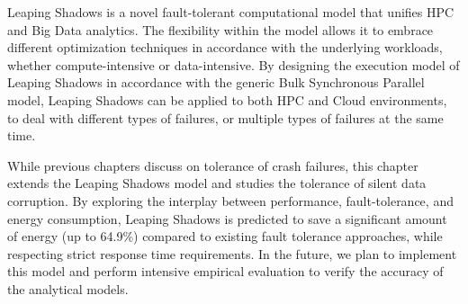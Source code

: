 Leaping Shadows is a novel fault-tolerant computational model that unifies HPC and Big Data analytics. 
The flexibility within the model allows it to embrace different optimization techniques in accordance with the underlying workloads, whether compute-intensive or data-intensive. 
By designing the execution model of Leaping Shadows in accordance with the generic Bulk Synchronous Parallel model, Leaping Shadows can be applied to both HPC and Cloud environments, to deal with different types of failures, or multiple types of failures at the same time. 

While previous chapters discuss on tolerance of crash failures, this chapter extends the Leaping Shadows model and studies the tolerance of silent data corruption. 
By exploring the interplay between performance, fault-tolerance, and energy consumption, Leaping Shadows is predicted to save a significant amount of energy (up to 64.9\%) compared to existing fault tolerance approaches, while respecting strict response time requirements. In the future, we plan to implement this model and perform intensive empirical evaluation to verify the accuracy of the analytical models.     










